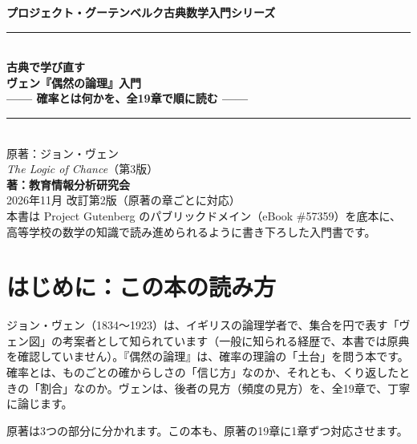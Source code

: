 \documentclass[a4paper,11pt,openany]{ltjsbook}
\begin{document}
\begin{titlepage}
\begin{center}
\vspace*{1.5cm}
{\Large\bfseries プロジェクト・グーテンベルク古典数学入門シリーズ}\\[0.8cm]
\rule{\textwidth}{1.5pt}\\[0.4cm]
{\Huge\bfseries 古典で学び直す\\ヴェン『偶然の論理』入門}\\[0.4cm]
{\Large\bfseries —— 確率とは何かを、全19章で順に読む ——}\\[0.4cm]
\rule{\textwidth}{1.5pt}\\[1.5cm]
{\large 原著：ジョン・ヴェン\\
\textit{The Logic of Chance}（第3版）}\\[2.0cm]
{\Large\bfseries 著：教育情報分析研究会}\\[2.5cm]
\vfill
{\large 2026年11月 改訂第2版（原著の章ごとに対応）}\\[0.5cm]
{\footnotesize 本書は Project Gutenberg のパブリックドメイン（eBook \#57359）を底本に、\\
高等学校の数学の知識で読み進められるように書き下ろした入門書です。}
\end{center}
\end{titlepage}

\frontmatter
\tableofcontents
\mainmatter

\chapter*{はじめに：この本の読み方}

ジョン・ヴェン（1834〜1923）は、イギリスの論理学者で、集合を円で表す「ヴェン図」の考案者として知られています（一般に知られる経歴で、本書では原典を確認していません）。『偶然の論理』は、確率の理論の「土台」を問う本です。確率とは、ものごとの確からしさの「信じ方」なのか、それとも、くり返したときの「割合」なのか。ヴェンは、後者の見方（頻度の見方）を、全19章で、丁寧に論じます。

原著は3つの部分に分かれます。この本も、原著の19章に1章ずつ対応させます。
\end{document}
